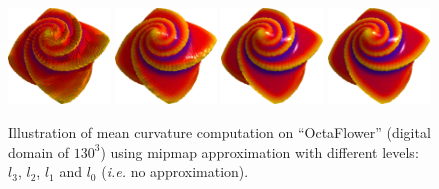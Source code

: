 \documentclass{llncs}
\newcommand{\ie}{\emph{i.e.}\xspace}
\begin{document}
\begin{figure}[!htbp]
  \vspace{-0.35cm}
  \begin{center}
   {\includegraphics[width=2.7cm]{figs/octa_r10_l3_a}}
   {\includegraphics[width=2.7cm]{figs/octa_r10_l2_a}}
   {\includegraphics[width=2.7cm]{figs/octa_r10_l1_a}}
   {\includegraphics[width=2.7cm]{figs/octa_r10_l0_a}}
  \end{center}
  \vspace{-0.35cm}
  \caption{Illustration of mean curvature computation on ``OctaFlower'' (digital domain of $130^3$) using mipmap approximation with different levels: $l_3$, $l_2$, $l_1$ and $l_0$ (\ie no approximation).
  }\label{fig:refine}
  \vspace{-0.35cm}
\end{figure}
%
\end{document}
